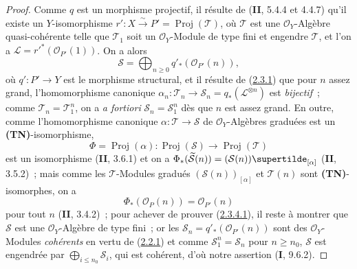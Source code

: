 \begin{proof}
Comme $q$ est un morphisme projectif, il résulte de (\textbf{II}, 5.4.4 et 4.4.7)
qu'il existe un $Y$-isomorphisme
$r':X\xrightarrow{\sim}P'=\operatorname{Proj}(\mathcal T)$, où
$\mathcal T$ est une $\mathcal O_Y$-Algèbre quasi-cohérente telle que
$\mathcal T_1$ soit un $\mathcal O_Y$-Module de type fini et engendre $\mathcal T$, et l'on a
$\mathcal L=r'^*(\mathcal O_{P'}(1))$. On a alors
\[
\mathcal S=\bigoplus_{n\geq0}q'_*(\mathcal O_{P'}(n)),
\]
où $q':P'\to Y$ est le morphisme
structural, et il résulte de (\hyperref[III.2.3.1-fr]{2.3.1}) que pour $n$ assez grand, l'homomorphisme canonique
$\alpha_n:\mathcal T_n\to\mathcal S_n=q_*(\mathcal L^{\otimes n})$ est
\emph{bijectif}~; comme $\mathcal T_n=\mathcal T_1^n$, on a
\emph{a fortiori} $\mathcal S_n=\mathcal S_1^n$ dès que $n$ est assez
grand. En outre, comme l'homomorphisme canonique
$\alpha:\mathcal T\to\mathcal S$ de $\mathcal O_Y$-Algèbres graduées est
un \textbf{(TN)}-isomorphisme,
\label{III.2.3.5.1-fr}
\[
\Phi=\operatorname{Proj}(\alpha):
\operatorname{Proj}(\mathcal S)\longrightarrow
\operatorname{Proj}(\mathcal T)
\]
est un isomorphisme (\textbf{II}, 3.6.1) et on a
$\Phi_*(\widetilde{\mathcal S}(n))=(\mathcal S(n))\supertilde_{[\alpha]}$ (\textbf{II}, 3.5.2)~; mais comme
les $\mathcal T$-Modules gradués $(\mathcal S(n))_{[\alpha]}$ et $\mathcal T(n)$ sont \textbf{(TN)}-isomorphes, on a
\[
\Phi_*(\mathcal O_P(n))=\mathcal O_{P'}(n)
\]
pour tout $n$ (\textbf{II}, 3.4.2)~; pour achever de prouver
(\hyperref[III.2.3.4.1-fr]{2.3.4.1}), il reste à montrer que $\mathcal S$
est une $\mathcal O_Y$-Algèbre de type fini~; or les
$\mathcal S_n=q'_*(\mathcal O_{P'}(n))$ sont des
$\mathcal O_Y$-Modules \emph{cohérents} en vertu de
(\hyperref[III.2.2.1-fr]{2.2.1}) et comme
$\mathcal S_1^n=\mathcal S_n$ pour $n\geq n_0$, $\mathcal S$ est
engendrée par $\bigoplus_{i\leq n_0}\mathcal S_i$, qui est cohérent,
d'où notre assertion (\textbf{I}, 9.6.2).


\end{proof}

